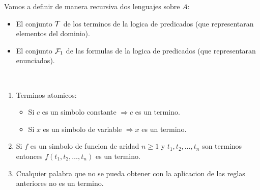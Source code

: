 Vamos a definir de manera recursiva dos lenguajes sobre \(A \):
\begin{itemize}
	\item El conjunto \(\mathcal{\MakeUppercase{t}}\) de los terminos de la logica de predicados (que representaran elementos del dominio).
	\item El conjunto \(\mathcal{\MakeUppercase{f}}_1 \) de las formulas de la logica de predicados (que representaran enunciados).
\end{itemize}

\begin{definition}
	~\begin{enumerate}
		\item Terminos atomicos: \begin{itemize}
			      \item Si \(c \) es un simbolo constante \(\Rightarrow c \) es un termino.
			      \item Si \(x \) es un simbolo de variable \(\Rightarrow x \) es un termino.
		      \end{itemize}
		\item Si \(f \) es un simbolo de funcion de aridad \(n \geq 1 \) y \(t_1,t_2,\ldots,t_n \) son terminos entonces \(f(t_1,t_2,\ldots,t_n )\) es un termino.
		\item Cualquier palabra que no se pueda obtener con la aplicacion de las reglas anteriores no es un termino.
	\end{enumerate}
\end{definition}

